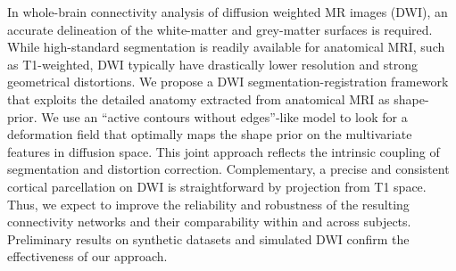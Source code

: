 In whole-brain connectivity analysis of diffusion weighted MR images (DWI),
an accurate delineation of the white-matter and grey-matter surfaces is required.
While high-standard segmentation is readily available for anatomical MRI, such 
as T1-weighted, DWI typically have drastically lower resolution and strong 
geometrical distortions. We propose a DWI segmentation-registration framework 
that exploits the detailed anatomy extracted from anatomical MRI as shape-prior.
We use an ``active contours without edges''-like model to look for a deformation
field that optimally maps the shape prior on the multivariate features 
in diffusion space. This joint approach reflects the intrinsic coupling of 
segmentation and distortion correction. Complementary, a precise and consistent
cortical parcellation on DWI is straightforward by projection from T1 space. Thus,
we expect to improve the reliability and robustness of the resulting connectivity 
networks and their comparability within and across subjects. Preliminary results 
on synthetic datasets and simulated DWI confirm the effectiveness of our approach.